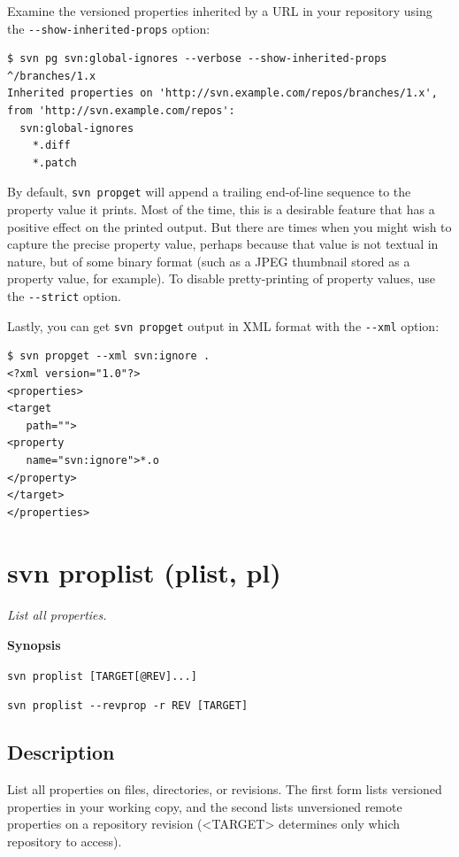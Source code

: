 Examine the versioned properties inherited by a URL in your repository
using the \texttt{-\/-show-inherited-props} option:

\begin{verbatim}
$ svn pg svn:global-ignores --verbose --show-inherited-props ^/branches/1.x
Inherited properties on 'http://svn.example.com/repos/branches/1.x',
from 'http://svn.example.com/repos':
  svn:global-ignores
    *.diff
    *.patch
\end{verbatim}

By default, \texttt{svn\ propget} will append a trailing end-of-line
sequence to the property value it prints. Most of the time, this is a
desirable feature that has a positive effect on the printed output. But
there are times when you might wish to capture the precise property
value, perhaps because that value is not textual in nature, but of some
binary format (such as a JPEG thumbnail stored as a property value, for
example). To disable pretty-printing of property values, use the
\texttt{-\/-strict} option.

Lastly, you can get \texttt{svn\ propget} output in XML format with the
\texttt{-\/-xml} option:

\begin{verbatim}
$ svn propget --xml svn:ignore .
<?xml version="1.0"?>
<properties>
<target
   path="">
<property
   name="svn:ignore">*.o
</property>
</target>
</properties>
\end{verbatim}

\section{svn proplist (plist, pl)}\label{svn.ref.svn.c.proplist}

\emph{List all properties.}

\textbf{Synopsis}

\texttt{svn\ proplist\ {[}TARGET{[}@REV{]}...{]}}

\texttt{svn\ proplist\ -\/-revprop\ -r\ REV\ {[}TARGET{]}}

\subsection{Description}

List all properties on files, directories, or revisions. The first form
lists versioned properties in your working copy, and the second lists
unversioned remote properties on a repository revision
(\textless TARGET\textgreater{} determines only which repository to
access).

